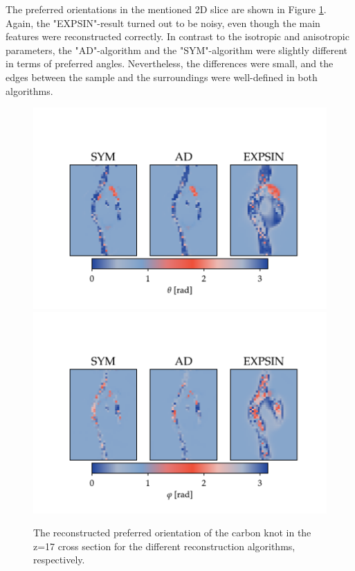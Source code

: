 \clearpage
The preferred orientations in the mentioned 2D slice are shown in Figure \ref{fig:carbon_knot_reconstruction_2D_angles}. %
Again, the "EXPSIN"-result turned out to be noisy, even though the main features were reconstructed correctly.
In contrast to the isotropic and anisotropic parameters,
the "AD"-algorithm and the "SYM"-algorithm were slightly different in terms of preferred angles.
Nevertheless, the differences were small, and the edges between the sample and the surroundings were well-defined in both algorithms.

\begin{figure}[h!]
    \centering

    \includegraphics[trim = {0 0 0 2.0cm}, clip, width = 1\textwidth]{./svg-inkscape/ck_slices_theta_svg-tex.pdf}
    \includegraphics[trim = {0 0 0 2.0cm}, clip, width = 1\textwidth]{./svg-inkscape/ck_slices_phi_svg-tex.pdf}
    \caption{  The reconstructed preferred orientation of the carbon knot in the z=17 cross section for the different reconstruction algorithms, respectively. }
    \label{fig:carbon_knot_reconstruction_2D_angles}
\end{figure}




